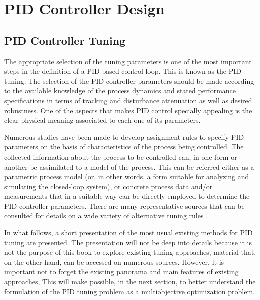 \chapter{PID Controller Design}
\label{chap:PIDControllerDesign}

\section{PID Controller Tuning}
The appropriate selection of the tuning parameters is one of the most important steps in the definition of a PID based control loop. This is known as the PID tuning. The selection of the PID controller parameters should be made according to the available knowledge of the process dynamics and stated performance specifications in terms of tracking and disturbance attenuation as well as desired robustness. One of the aspects that makes PID control specially appealing is the clear physical meaning associated to each one of its parameters.

Numerous studies have been made to develop assignment rules to specify PID parameters on the basis of characteristics of the process being controlled. The collected information about the process to be controlled can, in one form or another be assimilated to a model of the process. This can be referred either as a parametric process model (or, in other words, a form suitable for analyzing and simulating the closed-loop system), or concrete process data and/or measurements that in a suitable way can be directly employed to determine the PID controller parameters. There are many representative sources that can be consulted for details on a wide variety of alternative tuning rules  \citep{odwyer2006, VilanovaBook2012}.

In what follows, a short presentation of the most usual existing methods for PID tuning are presented. The presentation will not be deep into details because it is not the purpose of this book to explore existing tuning approaches, material that, on the other hand, can be accessed on numerous sources.  However, it is important not to forget the existing panorama and main features of existing approaches, This will make possible, in the next section, to better understand the formulation of the PID tuning problem as a multiobjective optimization problem.

